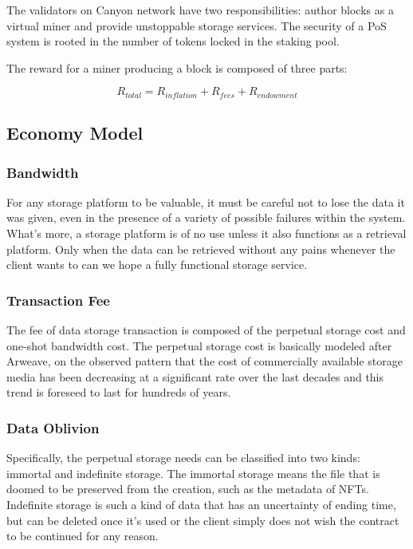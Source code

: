 \documentclass[]{article}
\newcounter{subsubsubsection}[subsubsection]
\begin{document}

The validators on Canyon network have two responsibilities: author blocks as a virtual miner and provide unstoppable storage services. The security of a PoS system is rooted in the number of tokens locked in the staking pool.


The reward for a miner producing a block is composed of three parts:

$$
R_{total} = R_{inflation} + R_{fees} + R_{endowment}
$$

\subsection{Economy Model}

\subsubsection{Bandwidth}

For any storage platform to be valuable, it must be careful not to lose the data it was given, even in the presence of a variety of possible failures within the system. What's more, a storage platform is of no use unless it also functions as a retrieval platform. Only when the data can be retrieved without any pains whenever the client wants to can we hope a fully functional storage service.

\subsubsection{Transaction Fee}

The fee of data storage transaction is composed of the perpetual storage cost and one-shot bandwidth cost. The perpetual storage cost is basically modeled after Arweave, on the observed pattern that the cost of commercially available storage media has been decreasing at a significant rate over the last decades and this trend is foreseed to last for hundreds of years.

\subsubsection{Data Oblivion}

Specifically, the perpetual storage needs can be classified into two kinds: immortal and indefinite storage. The immortal storage means the file that is doomed to be preserved from the creation, such as the metadata of NFTs. Indefinite storage is such a kind of data that has an uncertainty of ending time, but can be deleted once it's used or the client simply does not wish the contract to be continued for any reason.
\end{document}
